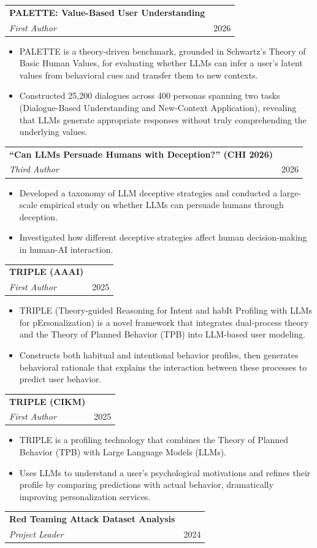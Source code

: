 \documentclass[a4paper,11pt]{article}
\makeatletter
\newcommand{\resumeProject}[4]{
\vspace{0.5mm}\item
    \begin{tabular*}{0.98\textwidth}[t]{@{}p{0.8\textwidth}@{\extracolsep{\fill}}r}
        \textbf{#1} & \textit{\footnotesize{#3}} \\
        \footnotesize{\textit{#2}} & \footnotesize{#4}
    \end{tabular*}
    \vspace{-2.4mm}
}
\newcommand{\resumeItemListStart}{\begin{itemize}[leftmargin=*,labelsep=1mm,itemsep=0.5mm]}
\newcommand{\resumeItemListEnd}{\end{itemize}\vspace{-2mm}}
\makeatother
\begin{document}
\resumeProject
  {PALETTE: Value-Based User Understanding}
  {First Author}
  {}
  {2026}

\resumeItemListStart
  \item PALETTE is a theory-driven benchmark, grounded in Schwartz's Theory of Basic Human Values, for evaluating whether LLMs can infer a user's latent values from behavioral cues and transfer them to new contexts.
  \item Constructed 25,200 dialogues across 400 personas spanning two tasks (Dialogue-Based Understanding and New-Context Application), revealing that LLMs generate appropriate responses without truly comprehending the underlying values.
\resumeItemListEnd

\resumeProject
  {``Can LLMs Persuade Humans with Deception?'' (CHI 2026)}
  {Third Author}
  {}
  {2026}

\resumeItemListStart
  \item Developed a taxonomy of LLM deceptive strategies and conducted a large-scale empirical study on whether LLMs can persuade humans through deception.
  \item Investigated how different deceptive strategies affect human decision-making in human-AI interaction.
\resumeItemListEnd

\resumeProject
  {TRIPLE (AAAI)}
  {First Author}
  {}
  {2025}

\resumeItemListStart
  \item TRIPLE (Theory-guided Reasoning for Intent and habIt Profiling with LLMs for pErsonalization) is a novel framework that integrates dual-process theory and the Theory of Planned Behavior (TPB) into LLM-based user modeling.
  \item Constructs both habitual and intentional behavior profiles, then generates behavioral rationale that explains the interaction between these processes to predict user behavior.
\resumeItemListEnd

\resumeProject
  {TRIPLE (CIKM)}
  {First Author}
  {}
  {2025}

\resumeItemListStart
  \item TRIPLE is a profiling technology that combines the Theory of Planned Behavior (TPB) with Large Language Models (LLMs).
  \item Uses LLMs to understand a user's psychological motivations and refines their profile by comparing predictions with actual behavior, dramatically improving personalization services.
\resumeItemListEnd

\resumeProject
  {Red Teaming Attack Dataset Analysis}
  {Project Leader}
  {}
  {2024}
\end{document}
